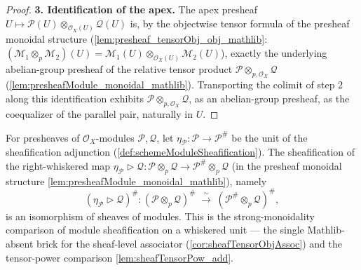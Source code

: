 \begin{proof}
  \textbf{3. Identification of the apex.} The apex presheaf
  \(U \mapsto \mathcal{P}(U) \otimes_{\mathcal{O}_X(U)} \mathcal{Q}(U)\) is, by the
  objectwise tensor formula of the presheaf monoidal structure
  (\cref{lem:presheaf_tensorObj_obj_mathlib}: \((\mathcal{M}_1 \otimes_p
  \mathcal{M}_2)(U) = \mathcal{M}_1(U) \otimes_{\mathcal{O}_X(U)}
  \mathcal{M}_2(U)\)), exactly the underlying abelian-group presheaf of the
  relative tensor product \(\mathcal{P} \otimes_{p,\mathcal{O}_X} \mathcal{Q}\)
  (\cref{lem:presheafModule_monoidal_mathlib}). Transporting the colimit of step 2
  along this identification exhibits
  \(\mathcal{P} \otimes_{p,\mathcal{O}_X} \mathcal{Q}\), as an abelian-group
  presheaf, as the coequalizer of the parallel pair, naturally in \(U\).
\end{proof}




\begin{lemma}
  \label{lem:isIso_sheafification_whiskerRight_unit}
  For presheaves of \(\mathcal{O}_X\)-modules \(\mathcal{P}, \mathcal{Q}\), let
  \(\eta_{\mathcal{P}} : \mathcal{P} \to \mathcal{P}^{\#}\) be the unit of the
  sheafification adjunction (\cref{def:schemeModuleSheafification}). The
  sheafification of the right-whiskered map
  \(\eta_{\mathcal{P}} \rhd \mathcal{Q} : \mathcal{P} \otimes_p \mathcal{Q} \to
  \mathcal{P}^{\#} \otimes_p \mathcal{Q}\) (in the presheaf monoidal structure
  \cref{lem:presheafModule_monoidal_mathlib}), namely
  \[
    (\eta_{\mathcal{P}} \rhd \mathcal{Q})^{\#} :
      (\mathcal{P} \otimes_p \mathcal{Q})^{\#}
      \;\xrightarrow{\ \sim\ }\;
      (\mathcal{P}^{\#} \otimes_p \mathcal{Q})^{\#},
  \]
  is an isomorphism of sheaves of modules. This is the strong-monoidality
  comparison of module sheafification on a whiskered unit --- the single
  Mathlib-absent brick for the sheaf-level associator
  (\cref{cor:sheafTensorObjAssoc}) and the tensor-power comparison
  \cref{lem:sheafTensorPow_add}.
\end{lemma}

